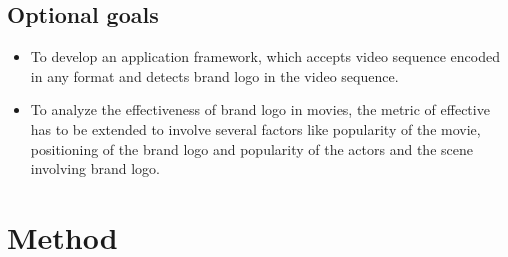 \subsection{Optional goals}
\begin{itemize}
	\item To develop an application framework, which accepts video sequence encoded in any format and detects brand logo in the video sequence.     
	
	\item To analyze the effectiveness of brand logo in movies, the metric of effective has to be extended to involve several factors like popularity of the movie, positioning of the brand logo and popularity of the actors and the scene involving brand logo. 
	
\end{itemize}     
 
\section{Method}
  
